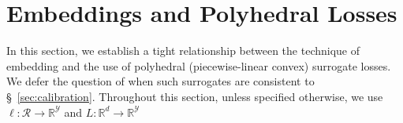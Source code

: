 \documentclass[12pt]{article}
\newcommand{\Comments}{1}
\newcommand{\mynote}[2]{\ifnum\Comments=1\textcolor{#1}{#2}\fi}
\newcommand{\raf}[1]{\mynote{darkgreen}{[RF: #1]}}
\newcommand{\reals}{\mathbb{R}}
\newcommand{\simplex}{\Delta_\Y}
\newcommand{\R}{\mathcal{R}}
\newcommand{\Y}{\mathcal{Y}}
\newcommand{\inprod}[2]{\langle #1, #2 \rangle}%
\newcommand{\ellzo}{\ell_{\text{0-1}}}
\DeclareMathOperator*{\argmax}{arg\,max}
\begin{document}











\section{Embeddings and Polyhedral Losses}
\label{sec:poly-loss-embed}

In this section, we establish a tight relationship between the technique of embedding and the use of polyhedral (piecewise-linear convex) surrogate losses.
We defer the question of when such surrogates are consistent to \S~\ref{sec:calibration}. 
Throughout this section, unless specified otherwise, we use $\ell:\R\to\reals^\Y$ and $L:\reals^d\to\reals^\Y$
\end{document}
